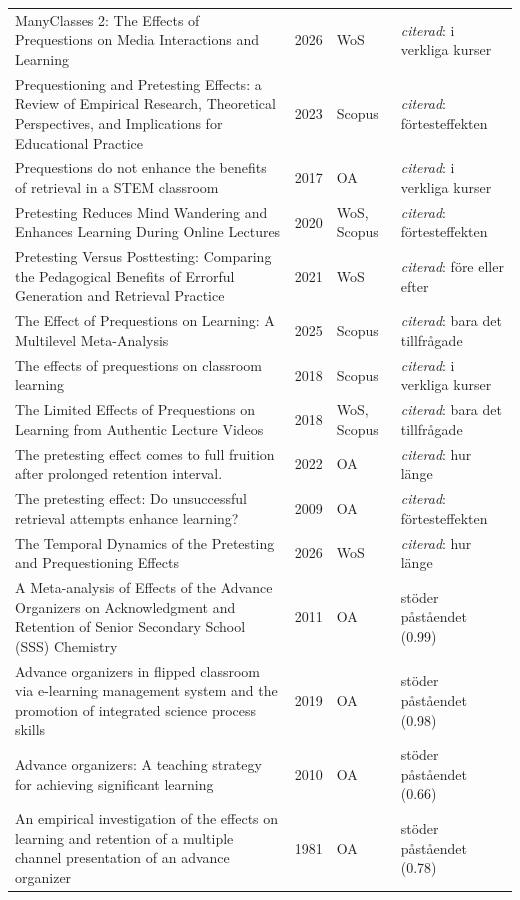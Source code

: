 \begin{longtable}{@{}%
  >{\raggedright\arraybackslash}p{}c%
  >{\raggedright\arraybackslash}p{}%
  >{\raggedright\arraybackslash}p{}@{}}
ManyClasses 2: The Effects of Prequestions on Media Interactions and Learning & 2026 & WoS & \emph{citerad}: i verkliga kurser \\
Prequestioning and Pretesting Effects: a Review of Empirical Research, Theoretical Perspectives, and Implications for Educational Practice & 2023 & Scopus & \emph{citerad}: förtesteffekten \\
Prequestions do not enhance the benefits of retrieval in a STEM classroom & 2017 & OA & \emph{citerad}: i verkliga kurser \\
Pretesting Reduces Mind Wandering and Enhances Learning During Online Lectures & 2020 & WoS, Scopus & \emph{citerad}: förtesteffekten \\
Pretesting Versus Posttesting: Comparing the Pedagogical Benefits of Errorful Generation and Retrieval Practice & 2021 & WoS & \emph{citerad}: före eller efter \\
The Effect of Prequestions on Learning: A Multilevel Meta-Analysis & 2025 & Scopus & \emph{citerad}: bara det tillfrågade \\
The effects of prequestions on classroom learning & 2018 & Scopus & \emph{citerad}: i verkliga kurser \\
The Limited Effects of Prequestions on Learning from Authentic Lecture Videos & 2018 & WoS, Scopus & \emph{citerad}: bara det tillfrågade \\
The pretesting effect comes to full fruition after prolonged retention interval. & 2022 & OA & \emph{citerad}: hur länge \\
The pretesting effect: Do unsuccessful retrieval attempts enhance learning? & 2009 & OA & \emph{citerad}: förtesteffekten \\
The Temporal Dynamics of the Pretesting and Prequestioning Effects & 2026 & WoS & \emph{citerad}: hur länge \\
A Meta-analysis of Effects of the Advance Organizers on Acknowledgment and Retention of Senior Secondary School (SSS) Chemistry & 2011 & OA & stöder påståendet (0.99) \\
Advance organizers in flipped classroom via e-learning management system and the promotion of integrated science process skills & 2019 & OA & stöder påståendet (0.98) \\
Advance organizers: A teaching strategy for achieving significant learning & 2010 & OA & stöder påståendet (0.66) \\
An empirical investigation of the effects on learning and retention of a multiple channel presentation of an advance organizer & 1981 & OA & stöder påståendet (0.78) \\

\end{longtable}
